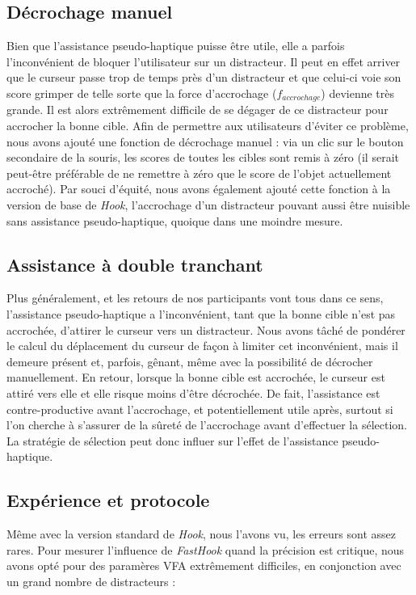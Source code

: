 	\subsection{Décrochage manuel}
	Bien que l'assistance pseudo-haptique puisse être utile, elle a parfois l'inconvénient de \og bloquer \fg{} l'utilisateur sur un distracteur. Il peut en effet arriver que le curseur passe trop de temps près d'un distracteur et que celui-ci voie son score grimper de telle sorte que la force d'accrochage ($f_{accrochage}$) devienne très grande. Il est alors extrêmement difficile de se dégager de ce distracteur pour accrocher la bonne cible. Afin de permettre aux utilisateurs d'éviter ce problème, nous avons ajouté une fonction de \og décrochage \fg{} manuel : via un clic sur le bouton secondaire de la souris, les scores de toutes les cibles sont remis à zéro (il serait peut-être préférable de ne remettre à zéro que le score de l'objet actuellement accroché). Par souci d'équité, nous avons également ajouté cette fonction à la version de base de \emph{Hook}, l'accrochage d'un distracteur pouvant aussi être nuisible sans assistance pseudo-haptique, quoique dans une moindre mesure.
	
	\subsection{Assistance à double tranchant}
	Plus généralement, et les retours de nos participants vont tous dans ce sens, l'assistance pseudo-haptique a l'inconvénient, tant que la bonne cible n'est pas accrochée, d'attirer le curseur vers un distracteur. Nous avons tâché de pondérer le calcul du déplacement du curseur de façon à limiter cet inconvénient, mais il demeure présent et, parfois, gênant, même avec la possibilité de décrocher manuellement. En retour, lorsque la bonne cible est accrochée, le curseur est attiré vers elle et elle risque moins d'être décrochée. De fait, l'assistance est contre-productive avant l'accrochage, et potentiellement utile après, surtout si l'on cherche à s'assurer de la sûreté de l'accrochage avant d'effectuer la sélection. La stratégie de sélection peut donc influer sur l'effet de l'assistance pseudo-haptique.
	
	\subsection{Expérience et protocole}
	Même avec la version standard de \emph{Hook}, nous l'avons vu, les erreurs sont assez rares. Pour mesurer l'influence de \emph{FastHook} quand la précision est critique, nous avons opté pour des paramères VFA extrêmement difficiles, en conjonction avec un grand nombre de distracteurs :
	
